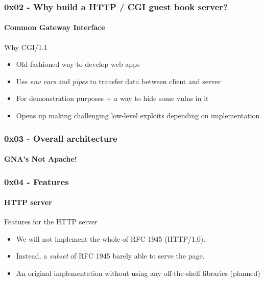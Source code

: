 \documentclass {beamer}
\begin{document}
\begin{frame}
  \frametitle{0x02 - Why build a HTTP / CGI guest book server?}
  \framesubtitle{Common Gateway Interface}

  Why CGI/1.1

  \begin{itemize}
    \item<1-> Old-fashioned way to develop web apps
    \item<2-> Use \textit{env vars} and \textit{pipes} to transfer data between client and server
    \item<3-> For demonstration purposes + a way to hide some vulns in it
    \item<4-> Opens up making challenging low-level exploits depending on implementation
  \end{itemize}
\end{frame}

\begin{frame}
  \frametitle{0x03 - Overall architecture}
  \framesubtitle{GNA's Not Apache!}

  \centering
\end{frame}

\begin{frame}
  \frametitle{0x04 - Features}
  \framesubtitle{HTTP server}

  Features for the HTTP server

  \begin{itemize}
    \item<1-> We will not implement the whole of RFC 1945 (HTTP/1.0).
    \item<2-> Instead, a \textit{subset} of RFC 1945 barely able to serve the page.
    \item<3-> An original implementation without using any off-the-shelf libraries (planned)
  \end{itemize}
\end{frame}
\end{document}
